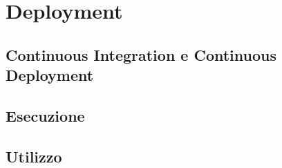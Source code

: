 \section{Deployment}
\subsection{Continuous Integration e Continuous Deployment}

\subsection{Esecuzione}

\subsection{Utilizzo}